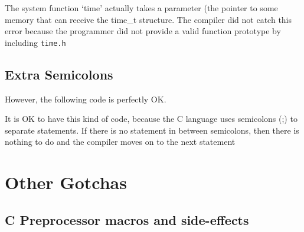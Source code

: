 The system function `time' actually takes a parameter (the pointer to
some memory that can receive the time\_t structure. The compiler did not
catch this error because the programmer did not provide a valid function
prototype by including \texttt{time.h}

\subsection{Extra Semicolons}\label{extra-semicolons}

\begin{Shaded}
\begin{Highlighting}[]
\NormalTok{(} \NormalTok{);}
\end{Highlighting}
\end{Shaded}

However, the following code is perfectly OK.

\begin{Shaded}
\end{Shaded}

It is OK to have this kind of code, because the C language uses
semicolons (;) to separate statements. If there is no statement in
between semicolons, then there is nothing to do and the compiler moves
on to the next statement

\section{Other Gotchas}\label{other-gotchas}

\subsection{C Preprocessor macros and
side-effects}\label{c-preprocessor-macros-and-side-effects}

\begin{Shaded}
\end{Shaded}

